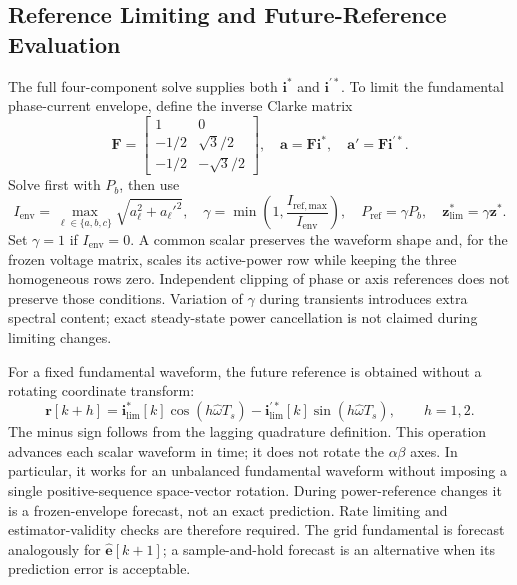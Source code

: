 \subsection{Reference Limiting and Future-Reference Evaluation}
The full four-component solve supplies both $\mathbf i^\ast$ and $\mathbf i^{\prime\ast}$. To limit the fundamental phase-current envelope, define the inverse Clarke matrix
\begin{equation}
\mathbf F=\begin{bmatrix}1&0\\-1/2&\sqrt3/2\\-1/2&-\sqrt3/2\end{bmatrix},\quad
\mathbf a=\mathbf F\mathbf i^\ast,\quad\mathbf a'=\mathbf F\mathbf i^{\prime\ast}.
\label{eq:ch5-inverse-clarke}
\end{equation}
Solve first with $P_b$, then use
\begin{equation}
I_{\mathrm{env}}=\max_{\ell\in\{a,b,c\}}\sqrt{a_\ell^2+a_\ell'^2},\quad
\gamma=\min\!\left(1,\frac{I_{\mathrm{ref,max}}}{I_{\mathrm{env}}}\right),\quad
P_{\mathrm{ref}}=\gamma P_b,\quad\mathbf z_{\mathrm{lim}}^\ast=\gamma\mathbf z^\ast.
\label{eq:ch5-reference-limiter}
\end{equation}
Set $\gamma=1$ if $I_{\mathrm{env}}=0$. A common scalar preserves the waveform shape and, for the frozen voltage matrix, scales its active-power row while keeping the three homogeneous rows zero. Independent clipping of phase or axis references does not preserve those conditions. Variation of $\gamma$ during transients introduces extra spectral content; exact steady-state power cancellation is not claimed during limiting changes.

For a fixed fundamental waveform, the future reference is obtained without a rotating coordinate transform:
\begin{equation}
\mathbf r[k+h]=\mathbf i_{\mathrm{lim}}^\ast[k]\cos(h\widehat\omega T_s)
-\mathbf i_{\mathrm{lim}}^{\prime\ast}[k]\sin(h\widehat\omega T_s),\qquad h=1,2.
\label{eq:ch5-reference-forecast}
\end{equation}
The minus sign follows from the lagging quadrature definition. This operation advances each scalar waveform in time; it does not rotate the $\alpha\beta$ axes. In particular, it works for an unbalanced fundamental waveform without imposing a single positive-sequence space-vector rotation. During power-reference changes it is a frozen-envelope forecast, not an exact prediction. Rate limiting and estimator-validity checks are therefore required. The grid fundamental is forecast analogously for $\widehat{\mathbf e}[k+1]$; a sample-and-hold forecast is an alternative when its prediction error is acceptable.

